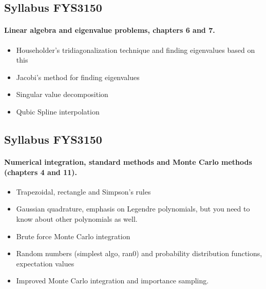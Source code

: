 \documentclass[%
oneside,                 %
final,                   %
10pt]{article}
\begin{document}
\noindent




\subsection*{Syllabus FYS3150}


\paragraph{Linear algebra and eigenvalue problems, chapters 6 and 7.}
\begin{itemize}
  \item Householder's tridiagonalization technique and finding eigenvalues based on this

  \item Jacobi's method for finding eigenvalues

  \item Singular value decomposition

  \item Qubic Spline interpolation
\end{itemize}

\noindent




\subsection*{Syllabus FYS3150}


\paragraph{Numerical integration, standard methods and Monte Carlo methods (chapters 4 and 11).}
\begin{itemize}
  \item Trapezoidal, rectangle and Simpson's rules

  \item Gaussian quadrature, emphasis on Legendre polynomials, but you need to know about other polynomials as well.

  \item Brute force Monte Carlo integration

  \item Random numbers (simplest algo, ran0) and probability distribution functions, expectation values

  \item Improved Monte Carlo integration and importance sampling.
\end{itemize}
\end{document}
